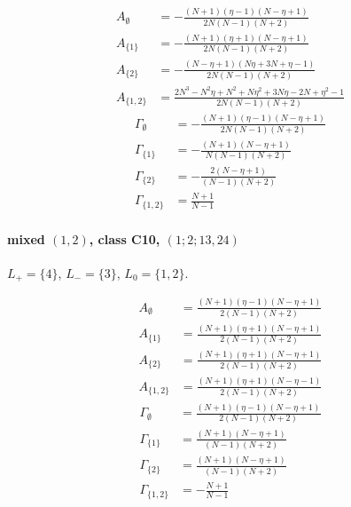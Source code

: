 \documentclass[11pt]{article}
\begin{document}
\begin{align*}
  A_{\emptyset} &= - \frac{\left(N + 1\right) \left(\eta - 1\right) \left(N - \eta + 1\right)}{2 N \left(N - 1\right) \left(N + 2\right)} \\
  A_{\{1\}} &= - \frac{\left(N + 1\right) \left(\eta + 1\right) \left(N - \eta + 1\right)}{2 N \left(N - 1\right) \left(N + 2\right)} \\
  A_{\{2\}} &= - \frac{\left(N - \eta + 1\right) \left(N \eta + 3 N + \eta - 1\right)}{2 N \left(N - 1\right) \left(N + 2\right)} \\
  A_{\{1,2\}} &= \frac{2 N^{3} - N^{2} \eta + N^{2} + N \eta^{2} + 3 N \eta - 2 N + \eta^{2} - 1}{2 N \left(N - 1\right) \left(N + 2\right)} 
\end{align*}
\begin{align*}
  \Gamma_{\emptyset} &= - \frac{\left(N + 1\right) \left(\eta - 1\right) \left(N - \eta + 1\right)}{2 N \left(N - 1\right) \left(N + 2\right)} \\
  \Gamma_{\{1\}} &= - \frac{\left(N + 1\right) \left(N - \eta + 1\right)}{N \left(N - 1\right) \left(N + 2\right)} \\
  \Gamma_{\{2\}} &= - \frac{2 \left(N - \eta + 1\right)}{\left(N - 1\right) \left(N + 2\right)} \\
  \Gamma_{\{1,2\}} &= \frac{N + 1}{N - 1} 
\end{align*}

\paragraph{mixed $(1,2)$, class C10, $(1;2;13,24)$}

$L_+=\{4\}$, $L_-=\{3\}$, $L_0=\{1,2\}$.

\begin{align*}
  A_{\emptyset} &= \frac{\left(N + 1\right) \left(\eta - 1\right) \left(N - \eta + 1\right)}{2 \left(N - 1\right) \left(N + 2\right)} \\
  A_{\{1\}} &= \frac{\left(N + 1\right) \left(\eta + 1\right) \left(N - \eta + 1\right)}{2 \left(N - 1\right) \left(N + 2\right)} \\
  A_{\{2\}} &= \frac{\left(N + 1\right) \left(\eta + 1\right) \left(N - \eta + 1\right)}{2 \left(N - 1\right) \left(N + 2\right)} \\
  A_{\{1,2\}} &= \frac{\left(N + 1\right) \left(\eta + 1\right) \left(N - \eta - 1\right)}{2 \left(N - 1\right) \left(N + 2\right)} 
\end{align*}
\begin{align*}
  \Gamma_{\emptyset} &= \frac{\left(N + 1\right) \left(\eta - 1\right) \left(N - \eta + 1\right)}{2 \left(N - 1\right) \left(N + 2\right)} \\
  \Gamma_{\{1\}} &= \frac{\left(N + 1\right) \left(N - \eta + 1\right)}{\left(N - 1\right) \left(N + 2\right)} \\
  \Gamma_{\{2\}} &= \frac{\left(N + 1\right) \left(N - \eta + 1\right)}{\left(N - 1\right) \left(N + 2\right)} \\
  \Gamma_{\{1,2\}} &= - \frac{N + 1}{N - 1} 
\end{align*}
\end{document}
